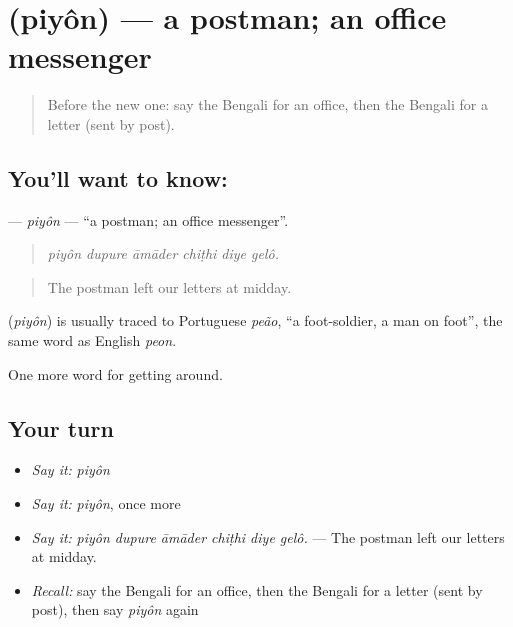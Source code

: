 \section[\texorpdfstring{\bn{পিয়ন} (piyôn)}{পিয়ন (piyôn)}]{ (piyôn) — a postman; an office messenger}

\label{lesson:BN-C411-piyon}



\begin{quote}
Before the new one: say the Bengali for an office, then the Bengali for a letter (sent by post).
\end{quote}

\subsection*{You'll want to know: }
\textbf{} — \emph{piyôn} — \textquotedblleft{}a postman; an office messenger\textquotedblright{}.

\begin{quote}
     
\end{quote}

\begin{quote}
\emph{piyôn dupure āmāder chiṭhi diye gelô.}
\end{quote}

\begin{quote}
The postman left our letters at midday.
\end{quote}

\begin{cousinweb}
\textbf{} (\emph{piyôn}) is usually traced to Portuguese \emph{peão}, \textquotedblleft{}a foot-soldier, a man on foot\textquotedblright{}, the same word as English \emph{peon}.
\end{cousinweb}

\begin{grammarlens}[title={What you've built}]
One more word for getting around.
\end{grammarlens}

\subsection*{Your turn}
\begin{itemize}
\raggedright
  \item \emph{Say it:} \emph{piyôn}
  \item \emph{Say it:} \emph{piyôn}, once more
  \item \emph{Say it:} \emph{piyôn dupure āmāder chiṭhi diye gelô.} — The postman left our letters at midday.
  \item \emph{Recall:} say the Bengali for an office, then the Bengali for a letter (sent by post), then say \emph{piyôn} again
\end{itemize}

